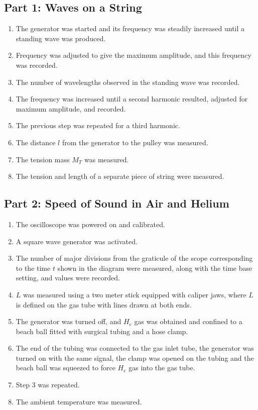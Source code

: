 \documentclass[twocolumn,english]{IEEEtran}
\theoremstyle{plain}
\theoremstyle{plain}
\begin{document}
\subsection*{Part 1: Waves on a String}
\begin{enumerate}
 \item The generator was started and its frequency was steadily increased until a standing wave was produced.
 \item Frequency was adjusted to give the maximum amplitude, and this frequency was recorded.
 \item The number of wavelengths observed in the standing wave was recorded.
 \item The frequency was increased until a second harmonic resulted, adjusted for maximum amplitude, and recorded.
 \item The previous step was repeated for a third harmonic.
 \item The distance $l$ from the generator to the pulley was measured.
 \item The tension mass $M_T$ was measured.
 \item The tension and length of a separate piece of string were measured.
\end{enumerate}
\subsection*{Part 2: Speed of Sound in Air and Helium}
\begin{enumerate}
 \item The oscilloscope was powered on and calibrated.
 \item A square wave generator was activated.
 \item The number of major divisions from the graticule of the scope corresponding to the time $t$ shown in the diagram were measured, along with the time base setting, and values were recorded.
 \item $L$ was measured using a two meter stick equipped with caliper jaws, where $L$ is defined on the gas tube with lines drawn at both ends.
 \item The generator was turned off, and $H_e$ gas was obtained and confined to  a beach ball fitted with surgical tubing and a hose clamp.
 \item The end of the tubing was connected to the gas inlet tube, the generator was turned on  with the same signal, the clamp was opened on the tubing and the beach ball was squeezed to force $H_e$ gas into the gas tube.
 \item Step 3 was repeated.
 \item The ambient temperature was measured.
\end{enumerate}
\end{document}
